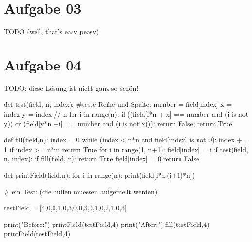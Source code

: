 \documentclass[10pt,a4paper]{article}
\begin{document}
\section*{Aufgabe 03}
    TODO (well, that's easy peasy)
    
\section*{Aufgabe 04}
    TODO: diese L\"osung ist nicht ganz so sch\"on!
    
    \begin{python}[frame=single]
def test(field, n, index):
    #teste Reihe und Spalte:
    number = field[index]
    x = index %
    y = index // n
    for i in range(n):
        if ((field[i*n + x] == number and (i is not y))
            or (field[y*n +i] == number and (i is not x))):
            return False;
    return True

def fill(field,n):
    index = 0
    while (index < n*n and field[index] is not 0):
        index += 1
    if index >= n*n:
        return True
    for i in range(1, n+1):
        field[index] = i
        if test(field, n, index):
            if fill(field, n):
                return True
    field[index] = 0
    return False


def printField(field,n):
    for i in range(n):
        print(field[i*n:(i+1)*n])

# ein Test: (die nullen muessen aufgefuellt werden)
        
testField = [4,0,0,1,0,3,0,0,3,0,1,0,2,1,0,3]

print("Before:")
printField(testField,4)
print("After:")
fill(testField,4)
printField(testField,4)

    \end{python}
\end{document}
